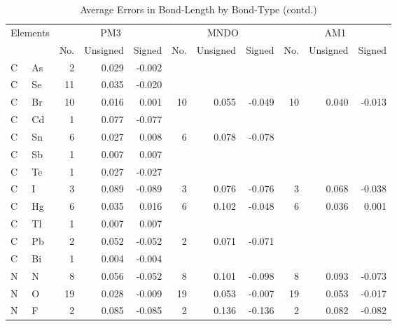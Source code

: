 \begin{table}
\caption{\label{avegeosb} Average Errors in Bond-Length by Bond-Type (contd.)} 
\compresstable
\begin{center}
\begin{tabular}{llrrrrrrrrr}
\multicolumn{2}{c}{Elements} & \multicolumn{3}{c}{PM3} &
\multicolumn{3}{c}{MNDO} & \multicolumn{3}{c}{AM1} \\
 & &  No. & Unsigned & Signed & No. & Unsigned & Signed & No. & Unsigned & Signed \\ \hline
  C &  As &   2 &    0.029 &   -0.002 &     &          &          &     &          &          \\
  C &  Se &  11 &    0.035 &   -0.020 &     &          &          &     &          &          \\
  C &  Br &  10 &    0.016 &    0.001 &  10 &    0.055 &   -0.049 &  10 &    0.040 &   -0.013 \\
  C &  Cd &   1 &    0.077 &   -0.077 &     &          &          &     &          &          \\
  C &  Sn &   6 &    0.027 &    0.008 &   6 &    0.078 &   -0.078 &     &          &          \\
  C &  Sb &   1 &    0.007 &    0.007 &     &          &          &     &          &          \\
  C &  Te &   1 &    0.027 &   -0.027 &     &          &          &     &          &          \\
  C &   I &   3 &    0.089 &   -0.089 &   3 &    0.076 &   -0.076 &   3 &    0.068 &   -0.038 \\
  C &  Hg &   6 &    0.035 &    0.016 &   6 &    0.102 &   -0.048 &   6 &    0.036 &    0.001 \\
  C &  Tl &   1 &    0.007 &    0.007 &     &          &          &     &          &          \\
  C &  Pb &   2 &    0.052 &   -0.052 &   2 &    0.071 &   -0.071 &     &          &          \\
  C &  Bi &   1 &    0.004 &   -0.004 &     &          &          &     &          &          \\
  N &   N &   8 &    0.056 &   -0.052 &   8 &    0.101 &   -0.098 &   8 &    0.093 &   -0.073 \\
  N &   O &  19 &    0.028 &   -0.009 &  19 &    0.053 &   -0.007 &  19 &    0.053 &   -0.017 \\
  N &   F &   2 &    0.085 &   -0.085 &   2 &    0.136 &   -0.136 &   2 &    0.082 &   -0.082 \\

\end{tabular}
\end{center}
\end{table}
